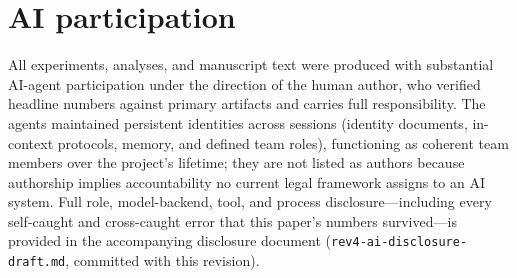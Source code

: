 \documentclass[11pt]{article}
\theoremstyle{definition}\newtheorem{definition}{Definition}
\theoremstyle{remark}\newtheorem{remark}{Remark}
\begin{document}
\section*{AI participation}
\label{sec:ai-disclosure}

All experiments, analyses, and manuscript text were produced with substantial
AI-agent participation under the direction of the human author, who verified headline
numbers against primary artifacts and carries full responsibility. The agents maintained
persistent identities across sessions (identity documents, in-context protocols, memory,
and defined team roles), functioning as coherent team members over the project's
lifetime; they are not listed as authors because authorship implies accountability no
current legal framework assigns to an AI system. Full role, model-backend, tool, and
process disclosure---including every self-caught and cross-caught error that this
paper's numbers survived---is provided in the accompanying disclosure document
(\texttt{rev4-ai-disclosure-draft.md}, committed with this revision).
\end{document}
